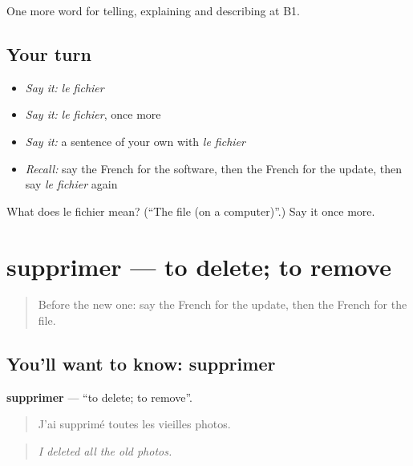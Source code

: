 \begin{grammarlens}[title={What you've built}]
One more word for telling, explaining and describing at B1.
\end{grammarlens}

\subsection*{Your turn}
\begin{itemize}
\raggedright
  \item \emph{Say it:} \emph{le fichier}
  \item \emph{Say it:} \emph{le fichier}, once more
  \item \emph{Say it:} a sentence of your own with \emph{le fichier}
  \item \emph{Recall:} say the French for the software, then the French for the update, then say \emph{le fichier} again
\end{itemize}

\begin{tcolorbox}[breakable,colback=teal!4,colframe=teal!35!black,title={Before you move on}]
What does le fichier mean? (\textquotedblleft{}The file (on a computer)\textquotedblright{}.) Say it once more.
\end{tcolorbox}
\section[supprimer]{supprimer — to delete; to remove}

\label{lesson:FR-C397-supprimer}



\begin{quote}
Before the new one: say the French for the update, then the French for the file.
\end{quote}

\subsection*{You'll want to know: supprimer}
\textbf{supprimer} — \textquotedblleft{}to delete; to remove\textquotedblright{}.

\begin{quote}
J'ai supprimé toutes les vieilles photos.
\end{quote}

\begin{quote}
\emph{I deleted all the old photos.}
\end{quote}

